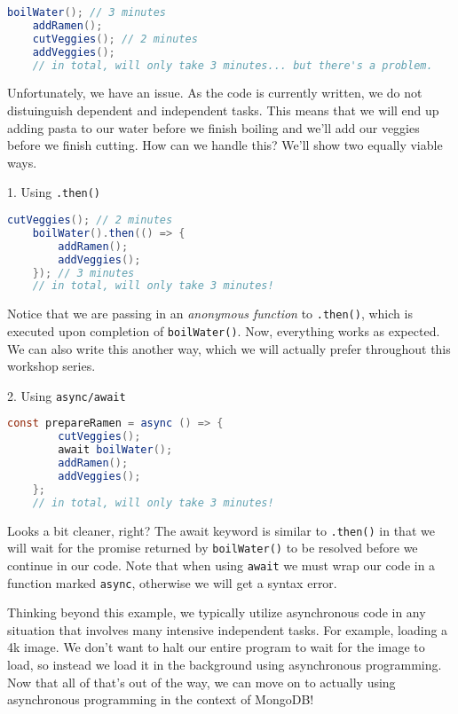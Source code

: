 \begin{lstlisting}[language=Java] 
    boilWater(); // 3 minutes
    addRamen();
    cutVeggies(); // 2 minutes
    addVeggies();
    // in total, will only take 3 minutes... but there's a problem.
\end{lstlisting}

Unfortunately, we have an issue. As the code is currently written, we do not distuinguish dependent and independent tasks. This means that we will end up adding pasta to our water before we finish boiling and we'll add our veggies before we finish cutting. How can we handle this? We'll show two equally viable ways.


1. Using \texttt{.then()}
\begin{lstlisting}[language=Java] 
    cutVeggies(); // 2 minutes
    boilWater().then(() => {
        addRamen();
        addVeggies();
    }); // 3 minutes
    // in total, will only take 3 minutes!
\end{lstlisting}

Notice that we are passing in an \emph{anonymous function} to \texttt{.then()}, which is executed upon completion of \texttt{boilWater()}. Now, everything works as expected. We can also write this another way, which we will actually prefer throughout this workshop series.
    
2. Using \texttt{async/await}
\begin{lstlisting}[language=Java] 
    const prepareRamen = async () => {
        cutVeggies();
        await boilWater();
        addRamen();
        addVeggies();
    };
    // in total, will only take 3 minutes!
\end{lstlisting}

Looks a bit cleaner, right? The await keyword is similar to \texttt{.then()} in that we will wait for the promise returned by \texttt{boilWater()} to be resolved before we continue in our code. Note that when using \texttt{await} we must wrap our code in a function marked \texttt{async}, otherwise we will get a syntax error. 

Thinking beyond this example, we typically utilize asynchronous code in any situation that involves many intensive independent tasks. For example, loading a 4k image. We don't want to halt our entire program to wait for the image to load, so instead we load it in the background using asynchronous programming. Now that all of that's out of the way, we can move on to actually using asynchronous programming in the context of MongoDB!

